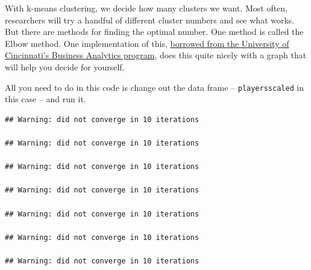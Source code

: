 \documentclass[
]{book}
\newenvironment{Shaded}{\begin{snugshade}}{\end{snugshade}}
\newcommand{\CommentTok}[1]{\textcolor[rgb]{0.56,0.35,0.01}{\textit{#1}}}
\newcommand{\ControlFlowTok}[1]{\textcolor[rgb]{0.13,0.29,0.53}{\textbf{#1}}}
\newcommand{\DataTypeTok}[1]{\textcolor[rgb]{0.13,0.29,0.53}{#1}}
\newcommand{\DecValTok}[1]{\textcolor[rgb]{0.00,0.00,0.81}{#1}}
\newcommand{\KeywordTok}[1]{\textcolor[rgb]{0.13,0.29,0.53}{\textbf{#1}}}
\newcommand{\NormalTok}[1]{#1}
\newcommand{\OperatorTok}[1]{\textcolor[rgb]{0.81,0.36,0.00}{\textbf{#1}}}
\newcommand{\StringTok}[1]{\textcolor[rgb]{0.31,0.60,0.02}{#1}}
\begin{document}
\begin{Shaded}
\end{Shaded}

With k-means clustering, we decide how many clusters we want. Most often, researchers will try a handful of different cluster numbers and see what works. But there are methods for finding the optimal number. One method is called the Elbow method. One implementation of this, \href{https://uc-r.github.io/kmeans_clustering}{borrowed from the University of Cincinnati's Business Analytics program}, does this quite nicely with a graph that will help you decide for yourself.

All you need to do in this code is change out the data frame -- \texttt{playersscaled} in this case -- and run it.

\begin{Shaded}
\end{Shaded}

\begin{verbatim}
## Warning: did not converge in 10 iterations

## Warning: did not converge in 10 iterations

## Warning: did not converge in 10 iterations

## Warning: did not converge in 10 iterations

## Warning: did not converge in 10 iterations

## Warning: did not converge in 10 iterations

## Warning: did not converge in 10 iterations
\end{verbatim}
\end{document}
